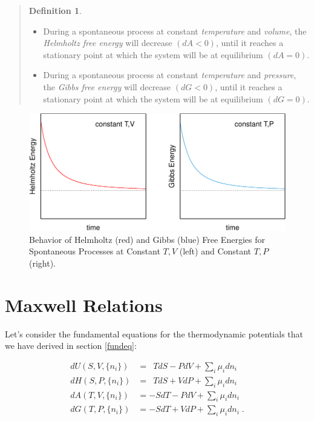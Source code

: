 \documentclass[
]{book}
\providecommand{\tightlist}{%
  \setlength{\itemsep}{0pt}\setlength{\parskip}{0pt}}
\theoremstyle{definition}
\newtheorem{definition}{Definition}[chapter]
\theoremstyle{definition}
\theoremstyle{definition}
\theoremstyle{remark}
\begin{document}
\begin{quote}
\begin{definition}
\protect\hypertarget{def:helmgibbsminimum}{}{\label{def:helmgibbsminimum} }\(\;\)

\begin{itemize}
\tightlist
\item
  During a spontaneous process at constant \emph{temperature} and \emph{volume}, the \emph{Helmholtz free energy} will decrease \((dA<0)\), until it reaches a stationary point at which the system will be at equilibrium \((dA=0)\).
\item
  During a spontaneous process at constant \emph{temperature} and \emph{pressure}, the \emph{Gibbs free energy} will decrease \((dG<0)\), until it reaches a stationary point at which the system will be at equilibrium \((dG=0)\).
\end{itemize}
\end{definition}
\end{quote}

\begin{figure}

{\centering \includegraphics{pchem1_files/figure-latex/agfig-1} 

}

\caption{Behavior of Helmholtz (red) and Gibbs (blue) Free Energies for Spontaneous Processes at Constant $T,V$ (left) and Constant $T,P$ (right).}\label{fig:agfig}
\end{figure}

\hypertarget{maxwell}{%
\section{Maxwell Relations}\label{maxwell}}

Let's consider the fundamental equations for the thermodynamic potentials that we have derived in section \ref{fundeq}:

\begin{equation}
\begin{aligned}
dU(S,V,\{n_i\}) &= \enspace T dS -P dV + \sum_i \mu_i dn_i \\
dH(S,P,\{n_i\}) &= \enspace T dS + V dP + \sum_i \mu_i dn_i \\
dA(T,V,\{n_i\}) &= -S dT -P dV + \sum_i \mu_i dn_i \\
dG(T,P,\{n_i\}) &= -S dT + V dP + \sum_i \mu_i dn_i\;.
\end{aligned}
\label{eq:dhagchem1}
\end{equation}
\end{document}
